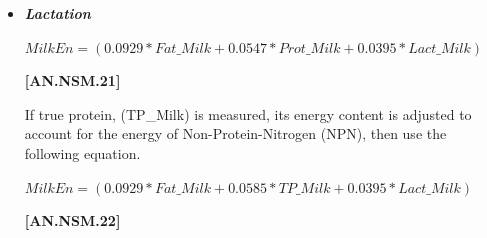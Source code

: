 \documentclass{article}
\begin{document}
\begin{refsection}
\begin{itemize}
            {\raggedleft \textbf{[AN.NSM.18]}\par}
\vspace{0.2cm}

\textit{\small During Involution}
\vspace{0.2cm}

\begin{center}
    \(MEpreg = (2 * 0.00159 * DOP - 0.0352) * \frac{CBW}{45} * 0.14, if DOP > 190.0\)
\end{center}
\vspace{0.5cm}

            {\raggedleft \textbf{[AN.NSM.19]}\par}
\vspace{0.2cm}

\textbf{Otherwise}
\vspace{0.25cm}

\begin{center}
    \(NEpreg = MEpreg * 0.64\)
\end{center}
\vspace{0.5cm}

            {\raggedleft \textbf{[AN.NSM.20]}\par}
\vspace{0.2cm}

        \item \textbf{\textit{Lactation}}
\vspace{0.2cm}

\begin{center}
    \(MilkEn = (0.0929 * Fat\_Milk + 0.0547 * Prot\_Milk + 0.0395 * Lact\_Milk)\)
\end{center}

\vspace{0.5cm}
            {\raggedleft \textbf{[AN.NSM.21]}\par}

\vspace{0.2cm}

If true protein, (TP\_Milk) is measured, its energy content is adjusted to account for the energy of Non-Protein-Nitrogen (NPN), then use the following equation. 
\vspace{0.2cm}

\begin{center}
    \(MilkEn = (0.0929 * Fat\_Milk + 0.0585 * TP\_Milk + 0.0395 * Lact\_Milk)\)
\end{center}

\vspace{0.5cm}
            {\raggedleft \textbf{[AN.NSM.22]}\par}


\end{itemize}
\end{refsection}
\end{document}
